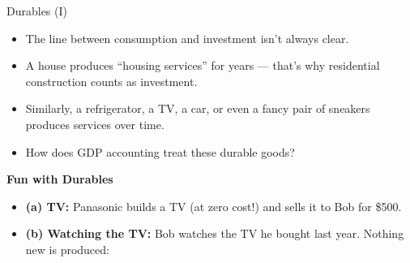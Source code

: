 \documentclass[10pt,aspectratio=169]{beamer}
\begin{document}
\begin{frame}{Durables (I)}

\begin{itemize}
\item The line between consumption and investment isn’t always clear.  
\item A house produces “housing services” for years — that’s why residential construction counts as investment.  
\item Similarly, a refrigerator, a TV, a car, or even a fancy pair of sneakers produces services over time.  
\item How does GDP accounting treat these durable goods?
\end{itemize}

\textbf{Fun with Durables}

\begin{itemize}
\item \textbf{(a) TV:}  
Panasonic builds a TV (at zero cost!) and sells it to Bob for \$500.  

\begin{table}
\end{table}

\item \textbf{(b) Watching the TV:}  
Bob watches the TV he bought last year. Nothing new is produced:  

\begin{table}
\end{table}
\end{itemize}

\end{frame}
\end{document}
